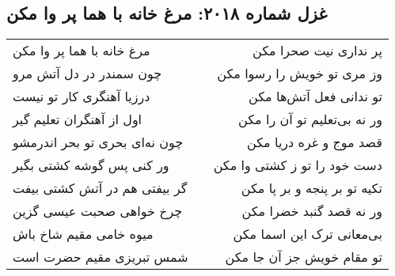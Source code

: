 \begin{center}
\section*{غزل شماره ۲۰۱۸: مرغ خانه با هما پر وا مکن}
\label{sec:2018}
\begin{longtable}{l p{0.5cm} r}
مرغ خانه با هما پر وا مکن
&&
پر نداری نیت صحرا مکن
\\
چون سمندر در دل آتش مرو
&&
وز مری تو خویش را رسوا مکن
\\
درزیا آهنگری کار تو نیست
&&
تو ندانی فعل آتش‌ها مکن
\\
اول از آهنگران تعلیم گیر
&&
ور نه بی‌تعلیم تو آن را مکن
\\
چون نه‌ای بحری تو بحر اندرمشو
&&
قصد موج و غره دریا مکن
\\
ور کنی پس گوشه کشتی بگیر
&&
دست خود را تو ز کشتی وا مکن
\\
گر بیفتی هم در آتش کشتی بیفت
&&
تکیه تو بر پنجه و بر پا مکن
\\
چرخ خواهی صحبت عیسی گزین
&&
ور نه قصد گنبد خضرا مکن
\\
میوه خامی مقیم شاخ باش
&&
بی‌معانی ترک این اسما مکن
\\
شمس تبریزی مقیم حضرت است
&&
تو مقام خویش جز آن جا مکن
\\
\end{longtable}
\end{center}
